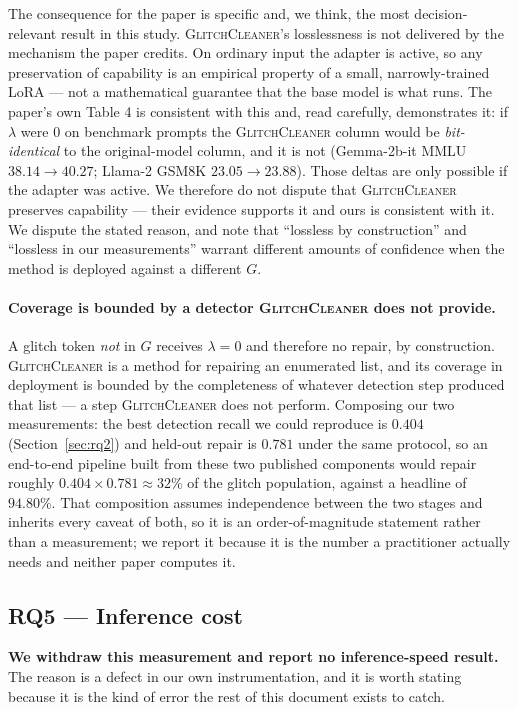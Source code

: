 \documentclass[11pt,a4paper]{article}
\newcommand{\gc}{\textsc{GlitchCleaner}}
\begin{document}
The consequence for the paper is specific and, we think, the most decision-relevant
result in this study. \gc{}'s losslessness is not delivered by the mechanism the
paper credits. On ordinary input the adapter is active, so any preservation of
capability is an empirical property of a small, narrowly-trained LoRA --- not a
mathematical guarantee that the base model is what runs. The paper's own Table 4
is consistent with this and, read carefully, demonstrates it: if $\lambda$ were
$0$ on benchmark prompts the \gc{} column would be \emph{bit-identical} to the
original-model column, and it is not (Gemma-2b-it MMLU $38.14 \rightarrow 40.27$;
Llama-2 GSM8K $23.05 \rightarrow 23.88$). Those deltas are only possible if the
adapter was active. We therefore do not dispute that \gc{} preserves capability ---
their evidence supports it and ours is consistent with it. We dispute the stated
reason, and note that ``lossless by construction'' and ``lossless in our
measurements'' warrant different amounts of confidence when the method is deployed
against a different $G$.

\paragraph{Coverage is bounded by a detector \gc{} does not provide.} A glitch
token \emph{not} in $G$ receives $\lambda = 0$ and therefore no repair, by
construction. \gc{} is a method for repairing an enumerated list, and its coverage
in deployment is bounded by the completeness of whatever detection step produced
that list --- a step \gc{} does not perform. Composing our two measurements: the
best detection recall we could reproduce is $0.404$
(Section~\ref{sec:rq2}) and held-out repair is $0.781$ under the same protocol, so
an end-to-end pipeline built from these two published components would repair
roughly $0.404 \times 0.781 \approx 32\%$ of the glitch population, against a
headline of $94.80\%$. That composition assumes independence between the two
stages and inherits every caveat of both, so it is an order-of-magnitude statement
rather than a measurement; we report it because it is the number a practitioner
actually needs and neither paper computes it.

\subsection{RQ5 --- Inference cost}
\label{sec:rq5}

\textbf{We withdraw this measurement and report no inference-speed result.} The
reason is a defect in our own instrumentation, and it is worth stating because it
is the kind of error the rest of this document exists to catch.
\end{document}
